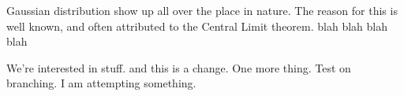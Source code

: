 Gaussian distribution show up all over the place in nature.
The reason for this is well known,
and often attributed to the Central Limit theorem. blah blah blah blah
\cite{clt} \cite{clt2}

We're interested in stuff. and this is a change. One more thing. Test on
branching. I am attempting something.
